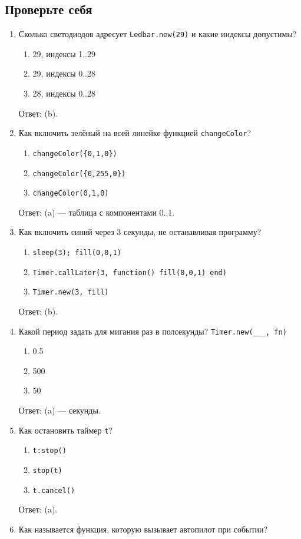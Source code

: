 \subsection{Проверьте себя}
\begin{enumerate}
\item Сколько светодиодов адресует \verb|Ledbar.new(29)| и какие индексы допустимы?
  \begin{enumerate}[label=(\alph*)] \item 29, индексы 1..29 \item 29, индексы 0..28 \item 28, индексы 0..28 \end{enumerate}
  Ответ: (b).
\item Как включить зелёный на всей линейке функцией \verb|changeColor|?
  \begin{enumerate}[label=(\alph*)] \item \verb|changeColor({0,1,0})| \item \verb|changeColor({0,255,0})| \item \verb|changeColor(0,1,0)| \end{enumerate}
  Ответ: (a) --- таблица с компонентами 0..1.
\item Как включить синий через 3 секунды, не останавливая программу?
  \begin{enumerate}[label=(\alph*)] \item \verb|sleep(3); fill(0,0,1)| \item \verb|Timer.callLater(3, function() fill(0,0,1) end)| \item \verb|Timer.new(3, fill)| \end{enumerate}
  Ответ: (b).
\item Какой период задать для мигания раз в полсекунды? \verb|Timer.new(___, fn)|
  \begin{enumerate}[label=(\alph*)] \item 0.5 \item 500 \item 50 \end{enumerate}
  Ответ: (a) --- секунды.
\item Как остановить таймер \verb|t|?
  \begin{enumerate}[label=(\alph*)] \item \verb|t:stop()| \item \verb|stop(t)| \item \verb|t.cancel()| \end{enumerate}
  Ответ: (a).
\item Как называется функция, которую вызывает автопилот при событии?

\end{enumerate}
